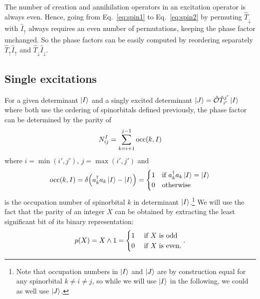 \documentclass[./thesis.tex]{subfiles}
\begin{document}
The number of creation and annihilation operators in an excitation operator is always even. Hence, going from Eq.~\eqref{eq:spin1} to Eq.~\eqref{eq:spin2} by permuting $\hat{T}_\downarrow$ with $\hat{I}_\uparrow$ always requires an even number of permutations, keeping the phase factor unchanged.
So the phase factors can be easily computed by reordering separately $\hat{T}_\uparrow \hat{I}_\uparrow$ and $\hat{T}_\downarrow  \hat{I}_\downarrow$.



\subsection{Single excitations}


For a given determinant $\ket{I}$ and a singly excited determinant $\ket{J} = {\hat{\mathcal{O}}} {\hat{T}_{i'}^{j'}} \ket{I}$ where both 
use the ordering of spinorbitals defined previously, the phase factor can be determined by the parity of
\begin{equation}
N^{I}_{ij}=\sum_{k=i+1}^{j-1} {\text{occ}(k,I)}
\end{equation}
where $i=\min(i',j')$, $j=\max(i',j')$ and
\begin{equation}
{\text{occ}(k,I)} = \delta \qty(a^\dagger_{k}a_{k} \ket{I} - \ket{I}) = \begin{cases}
 1 & \text{if } a^\dagger_{k}a_{k} \ket{I} = \ket{I} \\
 0 & \text{otherwise}
\end{cases}
\end{equation}
is the occupation number of spinorbital $k$ in determinant $\ket{I}$.\footnote{Note that occupation
numbers in $\ket{I}$ and $\ket{J}$ are by construction equal for any spinorbital $k \neq i \neq j$, so while we will use $\ket{I}$ in the following, we could as well use $\ket{J}$.
}
We will use the fact that the parity of an integer $X$ can be obtained by extracting the least significant bit of its binary representation: 
\begin{equation}
p(X)=X \wedge 1 = \begin{cases}
1 & \text{ if $X$ is odd  } \\
0 & \text{ if $X$ is even.} 
\end{cases}.
\end{equation}
\end{document}

